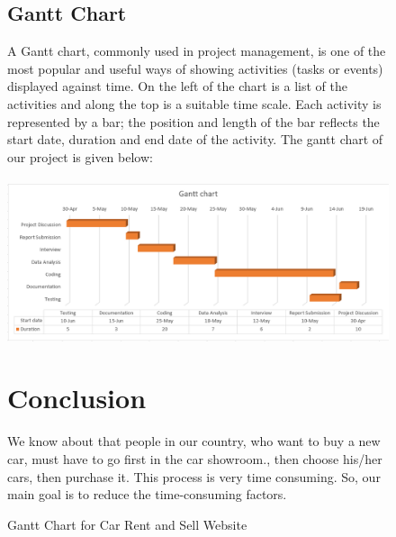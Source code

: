 \documentclass[10pt,twosides]{report}
\begin{document}
\begin{figure}

\subsection{   Gantt Chart}
A Gantt chart, commonly used in project management, is one of the most popular and useful ways of showing activities (tasks or events) displayed against time. On the left of the chart is a list of the activities and along the top is a suitable time scale. Each activity is represented by a bar; the position and length of the bar reflects the start date, duration and end date of the activity. The gantt chart of our project is given below:\\\\


\noindent \includegraphics*[width=5.51in, height=3 in]{figures/gannt_chart}

\caption{Gantt Chart for Car Rent and Sell Website}


\noindent 

\noindent 
\section{  Conclusion}

We know about that people in our country, who want to buy a new car, must have to go first in the car showroom., then choose his/her cars, then purchase it. This process is very time consuming. So, our main goal is to reduce the time-consuming factors.
\noindent 
\end{figure}
\noindent 







\end{document}
